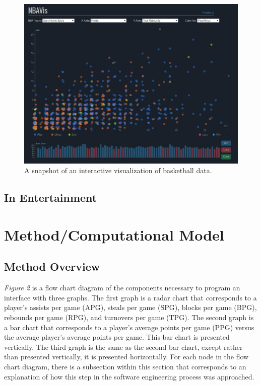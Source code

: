 \documentclass[journal]{vgtc}                %
\begin{document}
\begin{figure}[h]
\caption{A snapshot of an interactive visualization of basketball data.}
\includegraphics[width=\linewidth]{georgiatech.jpg}
\end{figure}


\subsection{In Entertainment}



\section{Method/Computational Model}
\subsection{Method Overview}
\emph{Figure 2} is a flow chart diagram of the components necessary to program an interface with three graphs. The first graph is a radar chart that corresponds to a player's assists per game (APG), steals per game (SPG), blocks per game (BPG), rebounds per game (RPG), and turnovers per game (TPG). The second graph is a bar chart that corresponds to a player's average points per game (PPG) versus the average player's average points per game. This bar chart is presented vertically. The third graph is the same as the second bar chart, except rather than presented vertically, it is presented horizontally. For each node in the flow chart diagram, there is a subsection within this section that corresponds to an explanation of how this step in the software engineering process was approached. 
\end{document}
